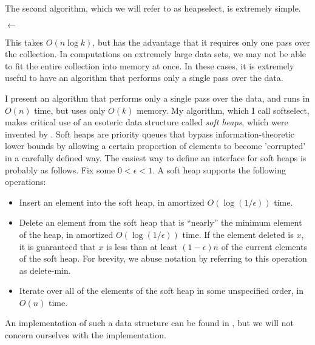 \documentclass[11pt]{article}
\begin{document}
The second algorithm, which we will refer to as heapselect, is extremely simple.

\begin{algorithm}[H]
\Heap$\leftarrow$
\Return{\ToArray{\Heap}}\;
\end{algorithm}
This takes $O(n \log k)$, but has the advantage that it requires only one pass over the collection. In computations on extremely large data sets, we may not be able to fit the entire collection into memory at once.  In these cases, it is extremely useful to have an algorithm that performs only a single pass over the data.

I present an algorithm that performs only a single pass over the data, and runs in $O(n)$ time, but uses only $O(k)$ memory.  My algorithm, which I call softselect, makes critical use of an esoteric data structure called {\em soft heaps}, which were invented by \cite{Ch00}.  Soft heaps are priority queues that bypass information-theoretic lower bounds by allowing a certain proportion of elements to become 'corrupted' in a carefully defined way.  The easiest way to define an interface for soft heaps is probably as follows.  Fix some $0 < \epsilon < 1$.  A soft heap supports the following operations:
\begin{itemize}
\item Insert an element into the soft heap, in amortized $O(\log(1/\epsilon))$ time.
\item Delete an element from the soft heap that is ``nearly'' the minimum element of the heap, in amortized $O(\log(1/\epsilon))$ time.  If the element deleted is $x$, it is guaranteed that $x$ is less than at least $(1-\epsilon) n$ of the current elements of the soft heap.  For brevity, we abuse notation by referring to this operation as delete-min.
\item Iterate over all of the elements of the soft heap in some unspecified order, in $O(n)$ time.
\end{itemize}
An implementation of such a data structure can be found in \cite{KZ09}, but we will not concern ourselves with the implementation.
\end{document}
